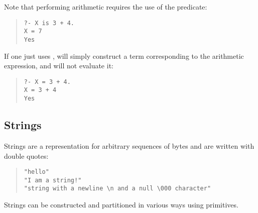 Note that performing arithmetic requires the use of the 
 predicate:

\begin{quote}\begin{verbatim}
?- X is 3 + 4.
X = 7
Yes
\end{verbatim}\end{quote}

If one just uses ,
\eclipse{} will simply construct a term corresponding to the
arithmetic expression, and will not evaluate it:

\begin{quote}\begin{verbatim}
?- X = 3 + 4.
X = 3 + 4
Yes
\end{verbatim}\end{quote}





\subsection{Strings}

 
Strings are a representation for arbitrary sequences of bytes and are
written with double quotes:
\begin{quote}\begin{verbatim}
"hello"
"I am a string!"
"string with a newline \n and a null \000 character"
\end{verbatim}\end{quote}
Strings can be constructed and partitioned in various ways using
{\eclipse} primitives.


